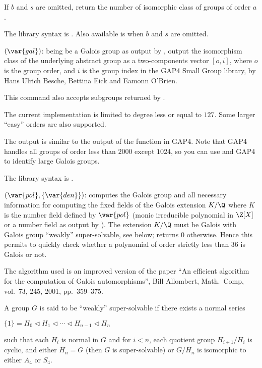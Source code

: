If $b$ and $s$ are omitted, return the number of isomorphic class of groups
of order $a$.

The library syntax is .
Also available is  when $b$ and $s$
are omitted.

$(\var{gal})$: \label{se:galoisidentify} being be a Galois group as output by ,
output the isomorphism class of the underlying abstract group as a
two-components vector $[o,i]$, where $o$ is the group order, and $i$ is the
group index in the GAP4 Small Group library, by Hans Ulrich Besche, Bettina
Eick and Eamonn O'Brien.

This command also accepts subgroups returned by .

The current implementation is limited to degree less or equal to $127$.
Some larger ``easy'' orders are also supported.

The output is similar to the output of the function  in GAP4.
Note that GAP4  handles all groups of order less than $2000$
except $1024$, so you can use  and GAP4 to identify large
Galois groups.

The library syntax is .

$(\var{pol},\{\var{den}\})$: \label{se:galoisinit}computes the Galois group
and all necessary information for computing the fixed fields of the
Galois extension $K/\Q$ where $K$ is the number field defined by
$\var{pol}$ (monic irreducible polynomial in $\Z[X]$ or
a number field as output by ). The extension $K/\Q$ must be
Galois with Galois group ``weakly'' super-solvable, see below;
returns 0 otherwise. Hence this permits to quickly check whether a polynomial
of order strictly less than $36$ is Galois or not.

The algorithm used is an improved version of the paper
``An efficient algorithm for the computation of Galois automorphisms'',
Bill Allombert, Math.~Comp, vol.~73, 245, 2001, pp.~359--375.

A group $G$ is said to be ``weakly'' super-solvable if there exists a
normal series

$\{1\} = H_0 \triangleleft H_1 \triangleleft \cdots \triangleleft H_{n-1}
\triangleleft H_n$

such that each $H_i$ is normal in $G$ and for $i<n$, each quotient group
$H_{i+1}/H_i$ is cyclic, and either $H_n=G$ (then $G$ is super-solvable) or
$G/H_n$ is isomorphic to either $A_4$ or $S_4$.

